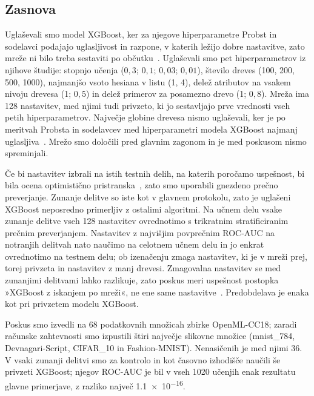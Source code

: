 \documentclass[a4paper,12pt,openright]{book}
\begin{document}
\subsection{Zasnova}

Uglaševali smo model XGBoost, ker za njegove hiperparametre Probst in
sodelavci podajajo uglasljivost in razpone, v katerih ležijo dobre nastavitve,
zato mreže ni bilo treba sestaviti po občutku~\cite{probst2019tunability}.
Uglaševali smo pet hiperparametrov iz njihove študije: stopnjo učenja
($0{,}3$; $0{,}1$; $0{,}03$; $0{,}01$), število dreves (100, 200, 500, 1000),
najmanjšo vsoto hesiana v listu (1, 4), delež atributov na vsakem nivoju
drevesa (1; $0{,}5$) in delež primerov za posamezno drevo (1; $0{,}8$). Mreža
ima 128 nastavitev, med njimi tudi privzeto, ki jo sestavljajo prve vrednosti
vseh petih hiperparametrov. Največje globine drevesa nismo uglaševali, ker je
po meritvah Probsta in sodelavcev med hiperparametri modela XGBoost najmanj
uglasljiva~\cite{probst2019tunability}. Mrežo smo določili pred glavnim
zagonom in je med poskusom nismo spreminjali.

Če bi nastavitev izbrali na istih testnih delih, na katerih poročamo
uspešnost, bi bila ocena optimistično pristranska~\cite{cawley2010over,varma2006bias},
zato smo uporabili gnezdeno prečno preverjanje. Zunanje delitve so iste kot v glavnem protokolu, zato je
uglašeni XGBoost neposredno primerljiv z ostalimi algoritmi. Na učnem delu
vsake zunanje delitve vseh 128 nastavitev ovrednotimo s trikratnim
stratificiranim prečnim preverjanjem. Nastavitev z najvišjim povprečnim
ROC-AUC na notranjih delitvah nato naučimo na celotnem učnem delu in jo enkrat
ovrednotimo na testnem delu; ob izenačenju zmaga nastavitev, ki je v mreži
prej, torej privzeta in nastavitev z manj drevesi. Zmagovalna nastavitev se med
zunanjimi delitvami lahko razlikuje, zato poskus meri uspešnost postopka
»XGBoost z iskanjem po mreži«, ne ene same
nastavitve~\cite{bischl2023hyperparameter}. Predobdelava je enaka kot pri
privzetem modelu XGBoost.

Poskus smo izvedli na 68 podatkovnih množicah zbirke OpenML-CC18; zaradi
računske zahtevnosti smo izpustili štiri največje slikovne množice
(mnist\_784, Devnagari-Script, CIFAR\_10 in Fashion-MNIST). Nenasičenih je
med njimi 36. V vsaki zunanji delitvi smo za kontrolo in kot časovno izhodišče
naučili še privzeti XGBoost; njegov ROC-AUC je bil v vseh 1020 učenjih enak
rezultatu glavne primerjave, z razliko največ \num{1.1e-16}.
\end{document}
